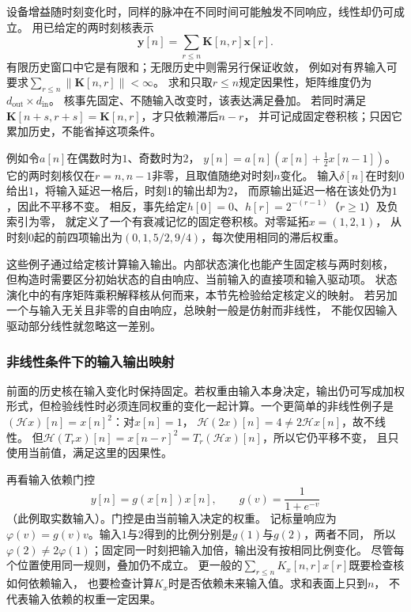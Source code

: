 设备增益随时刻变化时，同样的脉冲在不同时间可能触发不同响应，线性却仍可成立。
用已给定的两时刻核表示
\begin{equation}
  \bm y[n]=\sum_{r\leq n}\bm K[n,r]\bm x[r].
  \label{eq:signal-given-time-varying-kernel}
\end{equation}
有限历史窗口中它是有限和；无限历史中则需另行保证收敛，
例如对有界输入可要求$\sum_{r\leq n}\|\bm K[n,r]\|<\infty$。
求和只取$r\leq n$规定因果性，矩阵维度仍为
$d_{\mathrm{out}}\times d_{\mathrm{in}}$。
核事先固定、不随输入改变时，该表达满足叠加。
若同时满足$\bm K[n+s,r+s]=\bm K[n,r]$，才只依赖滞后$n-r$，
并可记成固定卷积核；只因它累加历史，不能省掉这项条件。

例如令$a[n]$在偶数时为$1$、奇数时为$2$，
$y[n]=a[n](x[n]+\tfrac12x[n-1])$。
它的两时刻核仅在$r=n,n-1$非零，且取值随绝对时刻$n$变化。
输入$\delta[n]$在时刻$0$给出$1$，将输入延迟一格后，时刻$1$的输出却为$2$，
而原输出延迟一格在该处仍为$1$，因此不平移不变。
相反，事先给定$h[0]=0$、$h[r]=2^{-(r-1)}$（$r\geq1$）及负索引为零，
就定义了一个有衰减记忆的固定卷积核。对零延拓$x=(1,2,1)$，
从时刻$0$起的前四项输出为$(0,1,5/2,9/4)$，每次使用相同的滞后权重。

这些例子通过给定核计算输入输出。内部状态演化也能产生固定核与两时刻核，
但构造时需要区分初始状态的自由响应、当前输入的直接项和输入驱动项。
状态演化中的有序矩阵乘积解释核从何而来，本节先检验给定核定义的映射。
若另加一个与输入无关且非零的自由响应，总映射一般是仿射而非线性，
不能仅因输入驱动部分线性就忽略这一差别。

\subsubsection{非线性条件下的输入输出映射}

前面的历史核在输入变化时保持固定。若权重由输入本身决定，输出仍可写成加权
形式，但检验线性时必须连同权重的变化一起计算。一个更简单的非线性例子是$(\mathcal Hx)[n]=x[n]^2$：对$x[n]=1$，
$\mathcal H(2x)[n]=4\neq2\mathcal Hx[n]$，故不线性。
但$\mathcal H(T_rx)[n]=x[n-r]^2=T_r(\mathcal Hx)[n]$，所以它仍平移不变，
且只使用当前值，满足这里的因果性。

再看输入依赖门控
\[
  y[n]=g(x[n])x[n],\qquad g(v)=\frac1{1+e^{-v}}
\]
（此例取实数输入）。门控是由当前输入决定的权重。
记标量响应为$\varphi(v)=g(v)v$。输入$1$与$2$得到的比例分别是$g(1)$与$g(2)$，两者不同，
所以$\varphi(2)\neq2\varphi(1)$；固定同一时刻把输入加倍，输出没有按相同比例变化。
尽管每个位置使用同一规则，叠加仍不成立。
更一般的$\sum_{r\leq n}K_x[n,r]x[r]$既要检查核如何依赖输入，
也要检查计算$K_x$时是否依赖未来输入值。求和表面上只到$n$，
不代表输入依赖的权重一定因果。

